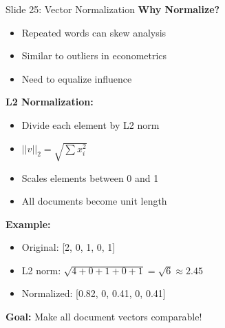 \documentclass[8pt]{beamer}
\begin{document}
	\begin{frame}{Slide 25: Vector Normalization}
		\fontsize{6.5}{7.5}\selectfont
		\textbf{Why Normalize?}
		\begin{itemize}
			\item Repeated words can skew analysis
			\item Similar to outliers in econometrics
			\item Need to equalize influence
		\end{itemize}
		
		\vspace{0.1cm}
		\textbf{L2 Normalization:}
		\begin{itemize}
			\item Divide each element by L2 norm
			\item $||v||_2 = \sqrt{\sum x_i^2}$
			\item Scales elements between 0 and 1
			\item All documents become unit length
		\end{itemize}
		
		\vspace{0.1cm}
		\textbf{Example:}
		\begin{itemize}
			\item Original: [2, 0, 1, 0, 1]
			\item L2 norm: $\sqrt{4+0+1+0+1} = \sqrt{6} \approx 2.45$
			\item Normalized: [0.82, 0, 0.41, 0, 0.41]
		\end{itemize}
		
		\textcolor{myblue}{\textbf{Goal:}} Make all document vectors comparable!
	\end{frame}
	
	
\end{document}
